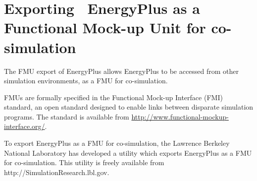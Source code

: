 \section{Exporting~ EnergyPlus as a Functional Mock-up Unit for co-simulation}\label{exporting-energyplus-as-a-functional-mock-up-unit-for-co-simulation}

The FMU export of EnergyPlus allows EnergyPlus to be accessed from other simulation environments, as a FMU for co-simulation.

FMUs are formally specified in the Functional Mock-up Interface (FMI) standard, an open standard designed to enable links between disparate simulation programs. The standard is available from \href{http://www.functional-mockup-interface.org/.\%20}{http://www.functional-mockup-interface.org/}.

To export EnergyPlus as a FMU for co-simulation, the Lawrence Berkeley National Laboratory has developed a utility which exports EnergyPlus as a FMU for co-simulation. This utility is freely available from http://SimulationResearch.lbl.gov.
